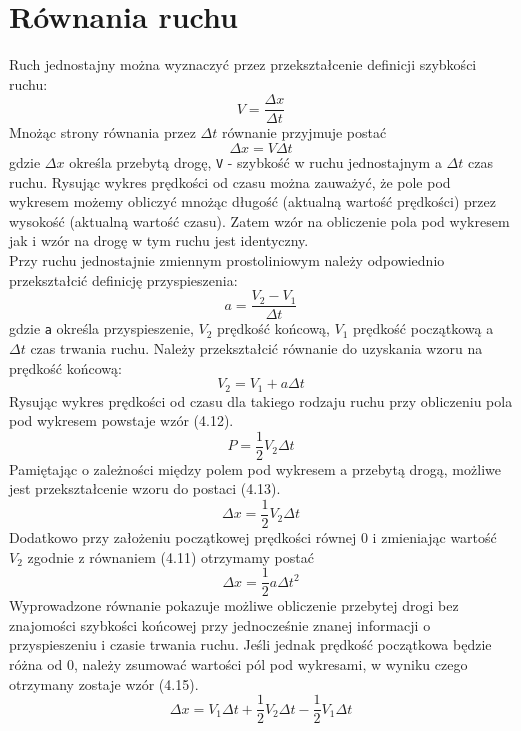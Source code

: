 \section{Równania ruchu}
Ruch jednostajny można wyznaczyć przez przekształcenie definicji szybkości ruchu:
\begin{equation}V=\frac{\Delta x}{\Delta t}\end{equation}
Mnożąc strony równania przez $\Delta t$ równanie przyjmuje postać \begin{equation}\Delta x=V\Delta t\end{equation}
gdzie $\Delta x$ określa przebytą drogę, \verb$V$ - szybkość w ruchu jednostajnym a $\Delta t$ czas ruchu. Rysując wykres prędkości od czasu można zauważyć, że pole pod wykresem możemy obliczyć mnożąc długość (aktualną wartość prędkości) przez wysokość (aktualną wartość czasu). Zatem wzór na obliczenie pola pod wykresem jak i wzór na drogę w tym ruchu jest identyczny.\\
Przy ruchu jednostajnie zmiennym prostoliniowym należy odpowiednio przekształcić definicję przyspieszenia:
\begin{equation}a=\frac{V_2 - V_1}{\Delta t}\end{equation} gdzie \verb$a$ określa przyspieszenie, $V_2$ prędkość końcową, $V_1$ prędkość początkową a $\Delta t$ czas trwania ruchu. Należy przekształcić równanie do uzyskania wzoru na prędkość końcową:
\begin{equation}V_2=V_1+a\Delta t\end{equation}
Rysując wykres prędkości od czasu dla takiego rodzaju ruchu przy obliczeniu pola pod wykresem powstaje wzór (4.12).
\begin{equation}P = \frac{1}{2}V_2\Delta t\end{equation}
Pamiętając o zależności między polem pod wykresem a przebytą drogą, możliwe jest przekształcenie wzoru do postaci (4.13). \begin{equation}\Delta x = \frac{1}{2}V_2\Delta t\end{equation}
Dodatkowo przy założeniu początkowej prędkości równej 0 i zmieniając wartość $V_2$ zgodnie z równaniem (4.11) otrzymamy postać \begin{equation}\Delta x = \frac{1}{2}a\Delta t^2\end{equation}
Wyprowadzone równanie pokazuje możliwe obliczenie przebytej drogi bez znajomości szybkości końcowej przy jednocześnie znanej informacji o przyspieszeniu i czasie trwania ruchu. Jeśli jednak prędkość początkowa będzie różna od 0, należy zsumować wartości pól pod wykresami, w wyniku czego otrzymany zostaje wzór (4.15). \begin{equation}\Delta x =V_1\Delta t + \frac{1}{2}V_2\Delta t - \frac{1}{2}V_1\Delta t\end{equation}
